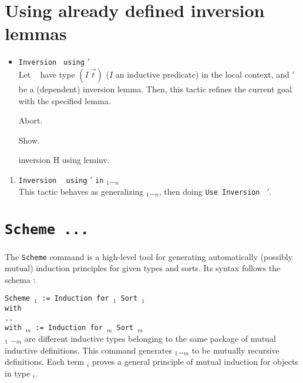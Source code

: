 \section{Using already defined inversion  lemmas}
\label{inversion_using}
\begin{itemize}
\item \texttt{Inversion} \ident \texttt{ using} \ident$'$ \\
  Let \ident~ have type $(I~\vec{t})$ ($I$ an inductive
  predicate) in the local context, and \ident$'$ be a (dependent) inversion
  lemma. Then, this tactic refines the current goal with the specified
  lemma. 


\begin{coq_eval}
Abort.
\end{coq_eval}

\begin{coq_example}
Show.
\end{coq_example}
\begin{coq_example}
inversion H using leminv.
\end{coq_example}


\end{itemize}
\variant
\begin{enumerate}
\item \texttt{Inversion} \ident~ \texttt{using} \ident$'$ \texttt{in} \ident$_1$\ldots \ident$_n$\\
This tactic behaves as generalizing  \ident$_1$\ldots \ident$_n$,
then doing \texttt{Use Inversion} \ident~\ident$'$.
\end{enumerate}

\section{\tt Scheme ...}\label{Scheme}
\label{scheme}
The {\tt Scheme} command is a high-level tool for generating
automatically (possibly mutual) induction principles for given types
and sorts.  Its syntax follows the schema :

\noindent
{\tt Scheme {\ident$_1$} := Induction for \term$_1$ Sort {\sort$_1$} \\
  with\\
  \mbox{}\hspace{0.1cm} .. \\
        with {\ident$_m$} := Induction for {\term$_m$} Sort
        {\sort$_m$}}\\
\term$_1$ \ldots \term$_m$ are different inductive types belonging to
the same package of mutual inductive definitions. This command
generates {\ident$_1$}\ldots{\ident$_m$} to be mutually recursive
definitions. Each term {\ident$_i$} proves a general principle 
of mutual induction for objects in type {\term$_i$}. 


